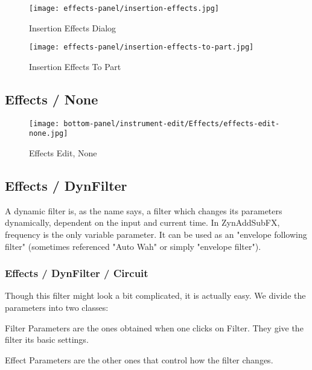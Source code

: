 \begin{figure}[H]
   \centering 
   \texttt{[image: effects-panel/insertion-effects.jpg]}
   \caption{Insertion Effects Dialog}
   \label{fig:insertion_effects_dialog}
\end{figure}

\begin{figure}[H]
   \centering 
   \texttt{[image: effects-panel/insertion-effects-to-part.jpg]}
   \caption{Insertion Effects To Part}
   \label{fig:insertion_effects_to_part}
\end{figure}

\subsection{Effects / None}
\label{subsec:effects_edit_none}

\begin{figure}[H]
   \centering 
   \texttt{[image: bottom-panel/instrument-edit/Effects/effects-edit-none.jpg]}
   \caption{Effects Edit, None}
   \label{fig:effects_edit_none}
\end{figure}


\subsection{Effects / DynFilter}
\label{subsec:effects_edit_dynfilter}

   A dynamic filter is, as the name says, a filter which changes its
   parameters dynamically, dependent on the input and current time. In
   ZynAddSubFX, frequency is the only variable parameter. It can be used as
   an "envelope following filter" (sometimes referenced "Auto Wah" or simply
   "envelope filter").

\subsubsection{Effects / DynFilter / Circuit}
\label{subsubsec:effects_edit_dynfilter_circuit}

   Though this filter might look a bit complicated, it is actually easy. We
   divide the parameters into two classes:

   Filter Parameters are the ones obtained when one clicks on Filter. They
   give the filter its basic settings.

   Effect Parameters are the other ones that control how the filter changes.

